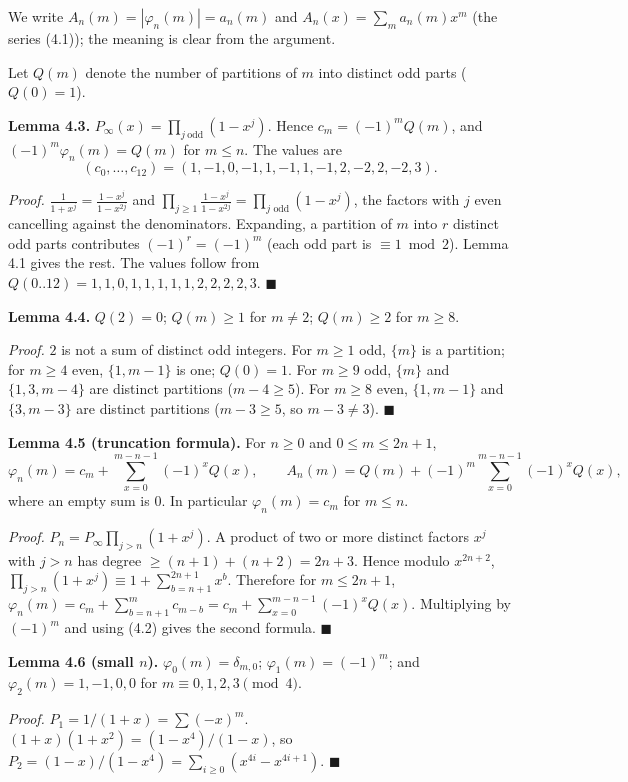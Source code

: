 We write \(A_n(m)=|\varphi_n(m)|=a_n(m)\) and \(A_n(x)=\sum_m a_n(m)x^m\) (the series (4.1)); the meaning is clear from the argument.

Let \(Q(m)\) denote the number of partitions of \(m\) into distinct odd parts (\(Q(0)=1\)).

\textbf{Lemma 4.3.} \(P_\infty(x)=\prod_{j\ \mathrm{odd}}(1-x^{j})\). Hence \(c_m=(-1)^mQ(m)\), and \((-1)^m\varphi_n(m)=Q(m)\) for \(m\le n\). The values are
\[(c_0,\dots,c_{12})=(1,-1,0,-1,1,-1,1,-1,2,-2,2,-2,3).\]

\emph{Proof.} \(\frac1{1+x^j}=\frac{1-x^j}{1-x^{2j}}\) and \(\prod_{j\ge1}\frac{1-x^j}{1-x^{2j}}=\prod_{j\text{ odd}}(1-x^j)\), the factors with \(j\) even cancelling against the denominators. Expanding, a partition of \(m\) into \(r\) distinct odd parts contributes \((-1)^r=(-1)^m\) (each odd part is \(\equiv1\bmod2\)). Lemma 4.1 gives the rest. The values follow from \(Q(0..12)=1,1,0,1,1,1,1,1,2,2,2,2,3\). \(\blacksquare\)

\textbf{Lemma 4.4.} \(Q(2)=0\); \(Q(m)\ge1\) for \(m\ne2\); \(Q(m)\ge2\) for \(m\ge8\).

\emph{Proof.} \(2\) is not a sum of distinct odd integers. For \(m\ge1\) odd, \(\{m\}\) is a partition; for \(m\ge4\) even, \(\{1,m-1\}\) is one; \(Q(0)=1\). For \(m\ge9\) odd, \(\{m\}\) and \(\{1,3,m-4\}\) are distinct partitions (\(m-4\ge5\)). For \(m\ge8\) even, \(\{1,m-1\}\) and \(\{3,m-3\}\) are distinct partitions (\(m-3\ge5\), so \(m-3\ne3\)). \(\blacksquare\)

\textbf{Lemma 4.5 (truncation formula).} For \(n\ge0\) and \(0\le m\le2n+1\),
\[\varphi_n(m)=c_m+\sum_{x=0}^{m-n-1}(-1)^xQ(x),\qquad A_n(m)=Q(m)+(-1)^m\sum_{x=0}^{m-n-1}(-1)^xQ(x),\tag{4.3}\]
where an empty sum is \(0\). In particular \(\varphi_n(m)=c_m\) for \(m\le n\).

\emph{Proof.} \(P_n=P_\infty\prod_{j>n}(1+x^j)\). A product of two or more distinct factors \(x^{j}\) with \(j>n\) has degree \(\ge(n+1)+(n+2)=2n+3\). Hence modulo \(x^{2n+2}\), \(\prod_{j>n}(1+x^j)\equiv1+\sum_{b=n+1}^{2n+1}x^b\). Therefore for \(m\le2n+1\), \(\varphi_n(m)=c_m+\sum_{b=n+1}^{m}c_{m-b}=c_m+\sum_{x=0}^{m-n-1}(-1)^xQ(x)\). Multiplying by \((-1)^m\) and using (4.2) gives the second formula. \(\blacksquare\)

\textbf{Lemma 4.6 (small \(n\)).} \(\varphi_0(m)=\delta_{m,0}\); \(\varphi_1(m)=(-1)^m\); and \(\varphi_2(m)=1,-1,0,0\) for \(m\equiv0,1,2,3\pmod 4\).

\emph{Proof.} \(P_1=1/(1+x)=\sum(-x)^m\). \((1+x)(1+x^2)=(1-x^4)/(1-x)\), so \(P_2=(1-x)/(1-x^4)=\sum_{i\ge0}(x^{4i}-x^{4i+1})\). \(\blacksquare\)

